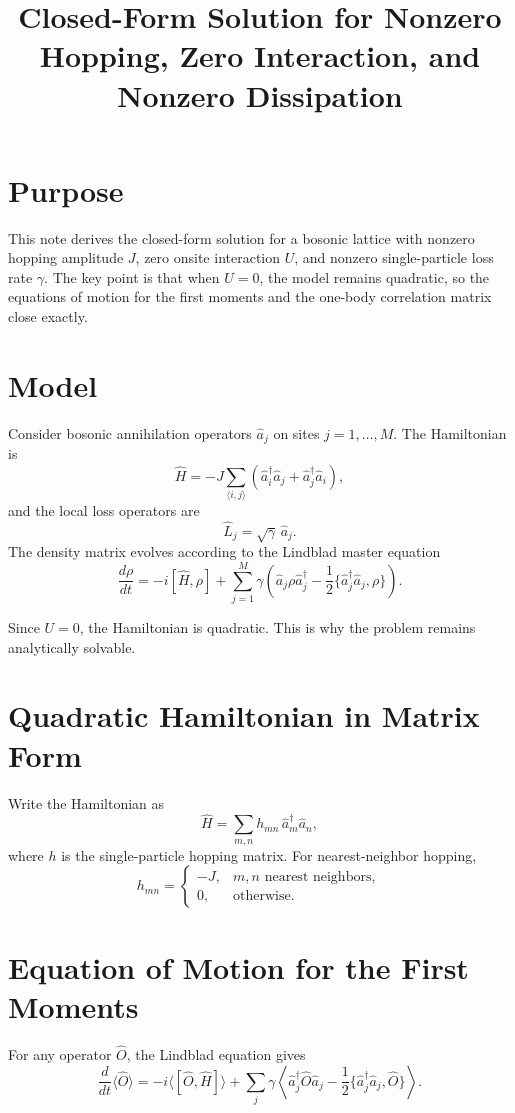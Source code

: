 \documentclass[12pt]{article}
\title{Closed-Form Solution for Nonzero Hopping, Zero Interaction, and Nonzero Dissipation}
\author{}
\date{}
\begin{document}
\maketitle

\section*{Purpose}
This note derives the closed-form solution for a bosonic lattice with nonzero hopping amplitude $J$, zero onsite interaction $U$, and nonzero single-particle loss rate $\gamma$. The key point is that when $U=0$, the model remains quadratic, so the equations of motion for the first moments and the one-body correlation matrix close exactly.

\section*{Model}
Consider bosonic annihilation operators $\hat a_j$ on sites $j=1,\dots,M$. The Hamiltonian is
\[
\hat H
=
-J\sum_{\langle i,j\rangle}
\left(\hat a_i^\dagger \hat a_j + \hat a_j^\dagger \hat a_i\right),
\]
and the local loss operators are
\[
\hat L_j = \sqrt{\gamma}\,\hat a_j.
\]
The density matrix evolves according to the Lindblad master equation
\[
\frac{d\rho}{dt}
=
-i[\hat H,\rho]
+
\sum_{j=1}^M
\gamma
\left(
\hat a_j \rho \hat a_j^\dagger
-\frac12 \{\hat a_j^\dagger \hat a_j,\rho\}
\right).
\]

Since $U=0$, the Hamiltonian is quadratic. This is why the problem remains analytically solvable.

\section*{Quadratic Hamiltonian in Matrix Form}
Write the Hamiltonian as
\[
\hat H = \sum_{m,n} h_{mn}\,\hat a_m^\dagger \hat a_n,
\]
where $h$ is the single-particle hopping matrix. For nearest-neighbor hopping,
\[
h_{mn} =
\begin{cases}
-J, & m,n \text{ nearest neighbors},\\
0, & \text{otherwise}.
\end{cases}
\]

\section*{Equation of Motion for the First Moments}
For any operator $\hat O$, the Lindblad equation gives
\[
\frac{d}{dt}\langle \hat O\rangle
=
-i\langle[\hat O,\hat H]\rangle
+
\sum_j \gamma
\left\langle
\hat a_j^\dagger \hat O \hat a_j
-\frac12\{\hat a_j^\dagger \hat a_j,\hat O\}
\right\rangle.
\]
\end{document}
